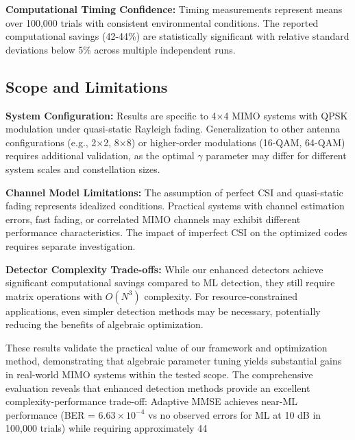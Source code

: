 \textbf{Computational Timing Confidence:} Timing measurements represent means over 100,000 trials with consistent environmental conditions. The reported computational savings (42-44\%) are statistically significant with relative standard deviations below 5\% across multiple independent runs.

\subsection{Scope and Limitations}
\textbf{System Configuration:} Results are specific to 4×4 MIMO systems with QPSK modulation under quasi-static Rayleigh fading. Generalization to other antenna configurations (e.g., 2×2, 8×8) or higher-order modulations (16-QAM, 64-QAM) requires additional validation, as the optimal $\gamma$ parameter may differ for different system scales and constellation sizes.

\textbf{Channel Model Limitations:} The assumption of perfect CSI and quasi-static fading represents idealized conditions. Practical systems with channel estimation errors, fast fading, or correlated MIMO channels may exhibit different performance characteristics. The impact of imperfect CSI on the optimized codes requires separate investigation.

\textbf{Detector Complexity Trade-offs:} While our enhanced detectors achieve significant computational savings compared to ML detection, they still require matrix operations with $O(N^3)$ complexity. For resource-constrained applications, even simpler detection methods may be necessary, potentially reducing the benefits of algebraic optimization.

These results validate the practical value of our framework and optimization method, demonstrating that algebraic parameter tuning yields substantial gains in real-world MIMO systems within the tested scope. The comprehensive evaluation reveals that enhanced detection methods provide an excellent complexity-performance trade-off: Adaptive MMSE achieves near-ML performance (BER = $6.63 \times 10^{-4}$ vs no observed errors for ML at 10 dB in 100,000 trials) while requiring approximately 44%
